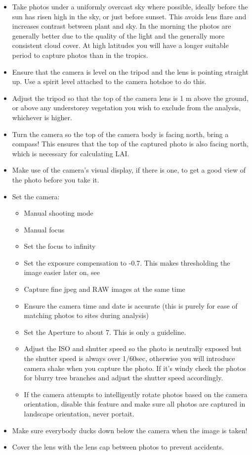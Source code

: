 \documentclass{article}
\begin{document}
\begin{itemize}
	\item{Take photos under a uniformly overcast sky where possible, ideally before the sun has risen high in the sky, or just before sunset. This avoids lens flare and increases contrast between plant and sky. In the morning the photos are generally better due to the quality of the light and the generally more consistent cloud cover. At high latitudes you will have a longer suitable period to capture photos than in the tropics.}
	\item{Ensure that the camera is level on the tripod and the lens is pointing straight up. Use a spirit level attached to the camera hotshoe to do this.}
	\item{Adjust the tripod so that the top of the camera lens is 1 m above the ground, or above any understorey vegetation you wish to exclude from the analysis, whichever is higher.} 
	\item{Turn the camera so the top of the camera body is facing north, bring a compass! This ensures that the top of the captured photo is also facing north, which is necessary for calculating LAI.}
	\item{Make use of the camera's visual display, if there is one, to get a good view of the photo before you take it.}
	\item{Set the camera:}
		\begin{itemize}
			\item{Manual shooting mode}
			\item{Manual focus}
			\item{Set the focus to infinity}
			\item{Set the exposure compensation to -0.7. This makes thresholding the image easier later on, see \citet{Zhang2005}}
			\item{Capture fine jpeg and RAW images at the same time}
			\item{Ensure the camera time and date is accurate (this is purely for ease of matching photos to sites during analysis)}
			\item{Set the Aperture to about 7. This is only a guideline.}
			\item{Adjust the ISO and shutter speed so the photo is neutrally exposed but the shutter speed is always over 1/60sec, otherwise you will introduce camera shake when you capture the photo. If it's windy check the photos for blurry tree branches and adjust the shutter speed accordingly.}
			\item{If the camera attempts to intelligently rotate photos based on the camera orientation, disable this feature and make sure all photos are captured in landscape orientation, never portait.}
		\end{itemize}
	\item{Make sure everybody ducks down below the camera when the image is taken!}
	\item{Cover the lens with the lens cap between photos to prevent accidents.}
\end{itemize}
\end{document}
